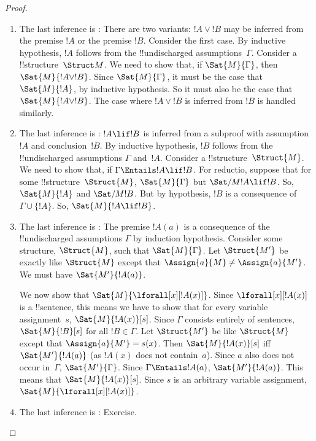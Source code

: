 \documentclass[../../include/open-logic-section]{subfiles}
\begin{document}
\begin{proof}
\begin{enumerate}
\item The last inference is \Intro{\lor}: There are two variants: $!A
  \lor !B$ may be inferred from the premise $!A$ or the premise
  $!B$. Consider the first case. By inductive hypothesis, $!A$ follows
  from the !!{undischarged} assumptions~$\Gamma$.  Consider a
  !!{structure}~$\Struct M$. We need to show that, if
  $\Sat{M}{\Gamma}$, then $\Sat{M}{!A \lor !B}$. Since
  $\Sat{M}{\Gamma}$, it must be the case that $\Sat{M}{!A}$, by
  inductive hypothesis. So it must also be the case that $\Sat{M}{!A \lor
    !B}$.  The case where $!A \lor !B$ is inferred from $!B$ is
  handled similarly.
  
\item The last inference is \Intro{\lif}: $!A \lif !B$ is inferred
  from a subproof with assumption~$!A$ and conclusion~$!B$. By
  inductive hypothesis, $!B$ follows from the !!{undischarged}
  assumptions $\Gamma$ and~$!A$. Consider a
  !!{structure}~$\Struct{M}$. We need to show that, if $\Gamma
  \Entails !A \lif !B$.  For reductio, suppose that for some
  !!{structure}~$\Struct{M}$, $\Sat{M}{\Gamma}$ but $\Sat/{M}{!A \lif
    !B}$. So, $\Sat{M}{!A}$ and $\Sat/{M}{!B}$. But by hypothesis,
  $!B$ is a consequence of $\Gamma \cup \{!A\}$. So, $\Sat{M}{!A \lif
    !B}$.
  
\item The last inference is \Intro{\lforall}: The premise $!A(a)$ is a
  consequence of the !!{undischarged} assumptions $\Gamma$ by
  induction hypothesis.  Consider some structure, $\Struct{M}$, such
  that $\Sat{M}{\Gamma}$. Let $\Struct{M'}$ be exactly like $\Struct{M}$
  except that $\Assign{a}{M} \neq \Assign{a}{M'}$. We must have
  $\Sat{M'}{!A(a)}$.

  We now show that $\Sat{M}{\lforall[x][!A(x)]}$. Since
  $\lforall[x][!A(x)]$ is a !!{sentence}, this means we have to show
  that for every variable assignment~$s$, $\Sat{M}{!A(x)}[s]$. Since
  $\Gamma$ consists entirely of sentences, $\Sat{M}{!B}[s]$ for all
  $!B \in \Gamma$.  Let $\Struct{M'}$ be like $\Struct{M}$ except that
  $\Assign{a}{M'} = s(x)$.  Then $\Sat{M}{!A(x)}[s]$ iff
  $\Sat{M'}{!A(a)}$ (as $!A(x)$ does not contain~$a$).  Since $a$ also
  does not occur in~$\Gamma$, $\Sat{M'}{\Gamma}$. Since $\Gamma
  \Entails !A(a)$, $\Sat{M'}{!A(a)}$. This means that
  $\Sat{M}{!A(x)}[s]$.  Since $s$ is an arbitrary variable assignment,
  $\Sat{M}{\lforall[x][!A(x)]}$.
  
\item The last inference is \Intro{\lexists}: Exercise.


\end{enumerate}
\end{proof}
\end{document}
